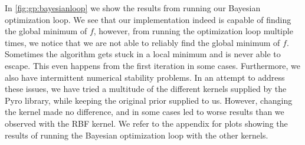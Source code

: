 In \cref{fig:gp:bayesianloop} we show the results from running our Bayesian optimization loop. We see that our implementation indeed is capable of finding the global minimum of $f$,
however, from running the optimization loop multiple times, we notice that we are not able to reliably find the global minimum of $f$. Sometimes the algorithm gets stuck in a local minimum and is never able to escape. This even happens from the first iteration in some cases. Furthermore, we also have intermittent numerical stability problems. In an attempt to address these issues, we have tried a multitude of the different kernels supplied by the Pyro library, while keeping the original prior supplied to us. However, changing the kernel made no difference, and in some cases led to worse results than we observed with the RBF kernel. We refer to the appendix for plots showing the results of running the Bayesian optimization loop with the other kernels.

